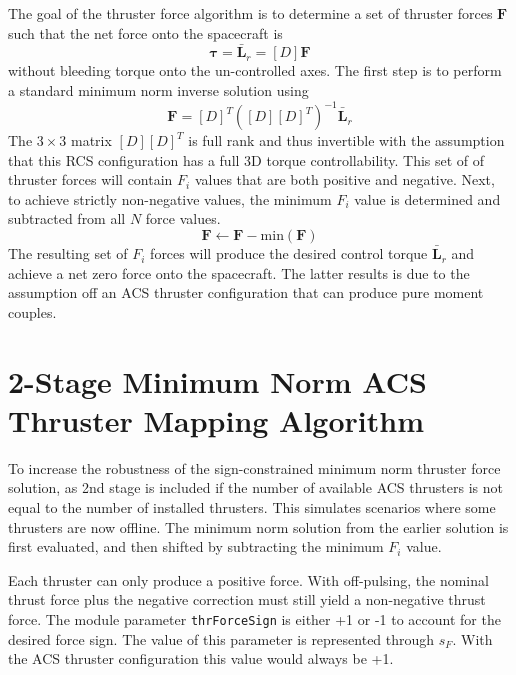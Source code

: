\documentclass[]{BasiliskReportMemo}
\begin{document}
The goal of the thruster force algorithm is to determine a set of thruster forces $\bm F$ such that the net force onto the spacecraft is
\begin{equation}
	\label{eq:th:2}
	\bm\tau = \bar{\bm L}_{r}  = [D]\bm F
\end{equation}
without bleeding torque onto the un-controlled axes.  The first step is to perform a standard minimum norm inverse solution using
\begin{equation}
	\label{eq:th:min}
	\bm F = [D]^{T}([D][D]^{T})^{-1} \bar{\bm L}_{r}
\end{equation}
The $3\times 3$ matrix $[D][D]^{T}$ is full rank and thus invertible with the assumption that this RCS configuration has a full 3D torque controllability.  This set of of thruster forces will contain $F_{i}$ values that are both positive and negative.  Next, to achieve strictly non-negative values, the minimum $F_{i}$ value is determined and subtracted from all $N$ force values.  
\begin{equation}
	\bm F \leftarrow \bm F -  \text{min}(\bm F)
\end{equation}
The resulting set of $F_{i}$ forces will produce the desired control torque $\bar{\bm L}_{r}$ and achieve a net zero force onto the spacecraft.  The latter results is due to the assumption off an ACS thruster configuration that can produce pure moment couples.  



\section{2-Stage Minimum Norm ACS Thruster Mapping Algorithm}
To increase the robustness of the sign-constrained minimum norm thruster force solution, as 2nd stage is included if the number of available ACS thrusters is not equal to the number of installed thrusters.  This simulates scenarios where some thrusters are now offline.    The minimum norm solution from the earlier solution is first evaluated, and then shifted by subtracting the minimum $F_{i}$ value.  

Each thruster can only produce a positive force.  With off-pulsing, the nominal thrust force plus the negative correction must still yield a non-negative thrust force.  The module parameter {\tt thrForceSign} is either +1 or -1 to account for the desired force sign.  The value of this parameter is represented through $s_{F}$.  With the ACS thruster configuration this value would always be +1.  
\end{document}

